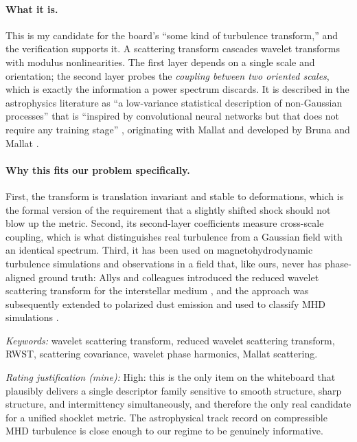 \documentclass[11pt]{article}
\newcommand{\keywords}[1]{\par\smallskip\noindent\textit{Keywords:} #1}
\newcommand{\rating}[1]{\par\smallskip\noindent\textit{Rating justification (mine):} #1}
\begin{document}
\paragraph{What it is.} This is my candidate for the board's ``some kind of turbulence
transform,'' and the verification supports it. A scattering transform cascades wavelet
transforms with modulus nonlinearities. The first layer depends on a single scale and
orientation; the second layer probes the \emph{coupling between two oriented scales}, which
is exactly the information a power spectrum discards. It is described in the astrophysics
literature as ``a low-variance statistical description of non-Gaussian processes'' that is
``inspired by convolutional neural networks but that does not require any training stage''
\cite{regaldo2020}, originating with Mallat \cite{mallat2012} and developed by Bruna and
Mallat \cite{brunamallat2013}.

\paragraph{Why this fits our problem specifically.} First, the transform is translation
invariant and stable to deformations, which is the formal version of the requirement that a
slightly shifted shock should not blow up the metric. Second, its second-layer coefficients
measure cross-scale coupling, which is what distinguishes real turbulence from a Gaussian
field with an identical spectrum. Third, it has been used on magnetohydrodynamic turbulence
simulations and observations in a field that, like ours, never has phase-aligned ground
truth: Allys and colleagues introduced the reduced wavelet scattering transform for the
interstellar medium \cite{allys2019}, and the approach was subsequently extended to
polarized dust emission \cite{regaldo2020} and used to classify MHD simulations
\cite{saydjari2021}.

\keywords{wavelet scattering transform, reduced wavelet scattering transform, RWST,
scattering covariance, wavelet phase harmonics, Mallat scattering.}

\rating{High: this is the only item on the whiteboard that plausibly delivers a single
descriptor family sensitive to smooth structure, sharp structure, and intermittency
simultaneously, and therefore the only real candidate for a unified shocklet metric. The
astrophysical track record on compressible MHD turbulence is close enough to our regime to be
genuinely informative.}

\end{document}
